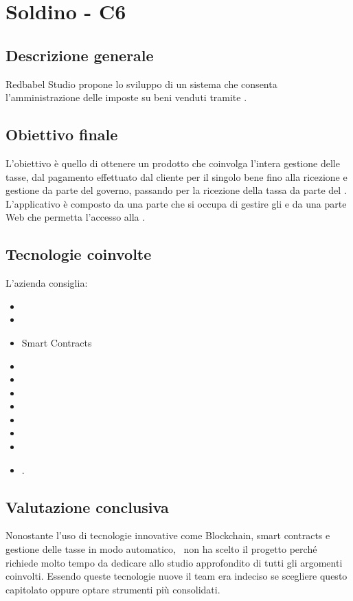 \section{Soldino - C6} \label{c6}
    \subsection{Descrizione generale}
    Redbabel Studio propone lo sviluppo di un sistema che consenta l'amministrazione delle  imposte su beni venduti tramite .
    \subsection{Obiettivo finale}

    L'obiettivo è quello di ottenere un prodotto che coinvolga l'intera gestione delle tasse, dal pagamento effettuato dal cliente per il singolo bene
    fino alla ricezione e gestione da parte del governo, passando per la ricezione della tassa da parte del .
    L'applicativo è composto da una parte che si occupa di gestire gli  e da una parte Web che permetta l'accesso alla .

    \subsection{Tecnologie coinvolte}
	L'azienda consiglia:
    	\begin{itemize}
        \item {}
		\item {}
        \item Smart Contracts
		\item {}
		\item {}
		\item {}
		\item {}
        \item {}
        \item {}
        \item {}
        \item {}.
	\end{itemize}

    \subsection{Valutazione conclusiva}
    Nonostante l'uso di tecnologie innovative come Blockchain, smart contracts e gestione delle tasse in modo automatico, \gruppo\ non ha scelto
    il progetto perché richiede molto tempo da dedicare allo studio approfondito di tutti gli argomenti coinvolti.
    Essendo queste tecnologie nuove il team era indeciso se scegliere questo capitolato oppure optare strumenti più consolidati.